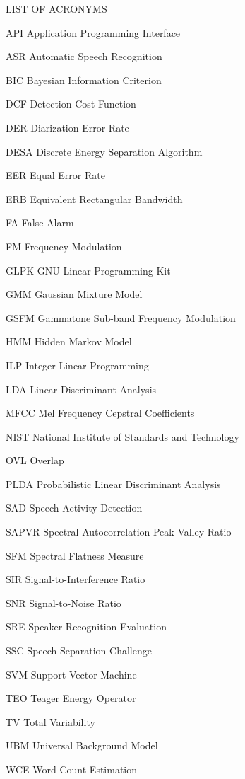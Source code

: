 \documentclass[doublespacing]{utdthesis}
\newcommand{\abbrlabel}[1]{\makebox[3cm][l]{\textbf{#1}\ \dotfill}}
\newenvironment{abbreviations}{\begin{list}{}{\renewcommand{\makelabel}{\abbrlabel}}}{\end{list}}
\begin{document}
\newpage
LIST OF ACRONYMS
\begin{abbreviations}
	\item[API] Application Programming Interface
	\item[ASR] Automatic Speech Recognition
	\item[BIC] Bayesian Information Criterion
	\item[DCF] Detection Cost Function
	\item[DER] Diarization Error Rate
	\item[DESA] Discrete Energy Separation Algorithm
	\item[EER] Equal Error Rate
	\item[ERB] Equivalent Rectangular Bandwidth
	\item[FA] False Alarm
	\item[FM] Frequency Modulation
	\item[GLPK] GNU Linear Programming Kit
	\item[GMM] Gaussian Mixture Model
	\item[GSFM] Gammatone Sub-band Frequency Modulation
	\item[HMM] Hidden Markov Model
	\item[ILP] Integer Linear Programming
	\item[LDA] Linear Discriminant Analysis
	\item[MFCC] Mel Frequency Cepstral Coefficients
	\item[NIST] National Institute of Standards and Technology
	\item[OVL] Overlap
	\item[PLDA] Probabilistic Linear Discriminant Analysis
	\item[SAD] Speech Activity Detection
	\item[SAPVR] Spectral Autocorrelation Peak-Valley Ratio
	\item[SFM] Spectral Flatness Measure
	\item[SIR] Signal-to-Interference Ratio
	\item[SNR] Signal-to-Noise Ratio
	\item[SRE] Speaker Recognition Evaluation
	\item[SSC] Speech Separation Challenge
	\item[SVM] Support Vector Machine
	\item[TEO] Teager Energy Operator
	\item[TV] Total Variability
	\item[UBM] Universal Background Model
	\item[WCE] Word-Count Estimation
\end{abbreviations}
\end{document}
